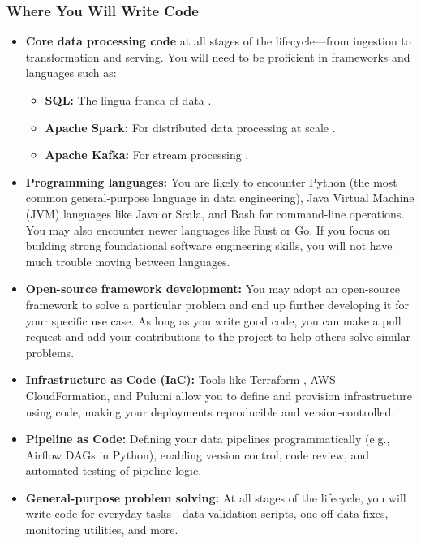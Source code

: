 \documentclass{article}
\begin{document}
\subsubsection{Where You Will Write Code}
\begin{itemize}
    \item \textbf{Core data processing code} at all stages of the lifecycle---from ingestion to transformation and serving. You will need to be proficient in frameworks and languages such as:
    \begin{itemize}
        \item \textbf{SQL:} The lingua franca of data \cite{date2003introduction}.
        \item \textbf{Apache Spark:} For distributed data processing at scale \cite{zaharia2016spark}.
        \item \textbf{Apache Kafka:} For stream processing \cite{narkhede2017kafka}.
    \end{itemize}

    \item \textbf{Programming languages:} You are likely to encounter Python (the most common general-purpose language in data engineering), Java Virtual Machine (JVM) languages like Java or Scala, and Bash for command-line operations. You may also encounter newer languages like Rust or Go. If you focus on building strong foundational software engineering skills, you will not have much trouble moving between languages.

    \item \textbf{Open-source framework development:} You may adopt an open-source framework to solve a particular problem and end up further developing it for your specific use case. As long as you write good code, you can make a pull request and add your contributions to the project to help others solve similar problems.

    \item \textbf{Infrastructure as Code (IaC):} Tools like Terraform \cite{brikman2019terraform}, AWS CloudFormation, and Pulumi allow you to define and provision infrastructure using code, making your deployments reproducible and version-controlled.

    \item \textbf{Pipeline as Code:} Defining your data pipelines programmatically (e.g., Airflow DAGs in Python), enabling version control, code review, and automated testing of pipeline logic.

    \item \textbf{General-purpose problem solving:} At all stages of the lifecycle, you will write code for everyday tasks---data validation scripts, one-off data fixes, monitoring utilities, and more.
\end{itemize}
\end{document}
